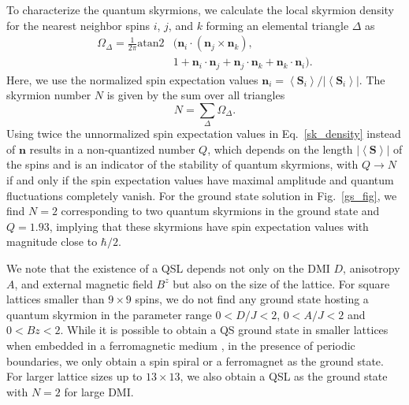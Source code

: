 \documentclass[aps,prb,twocolumn,superscriptaddress,a4paper,longbibliography]{revtex4-2}
\begin{document}
To characterize the quantum skyrmions, we calculate the local skyrmion density for the nearest neighbor spins $i$, $j$, and $k$ forming an elemental triangle $\Delta$ as \cite{berg_definition_1981,siegl_controlled_2022,peters_quantum_2023}
\begin{align}
    \Omega_{\Delta}=\frac{1}{2\pi}\text{atan2}&({\textbf{n}_i\cdot(\textbf{n}_j\times\textbf{n}_k)},\\
    &{1+\textbf{n}_i\cdot\textbf{n}_j+\textbf{n}_j\cdot\textbf{n}_k+\textbf{n}_k\cdot\textbf{n}_i}).
    \label{sk_density}
\end{align}
Here, we use the normalized spin expectation values $\textbf{n}_i=\left<\boldsymbol{S}_i\right>/|\left<\boldsymbol{S}_i\right>|$. The skyrmion number $N$ is given by the sum over all triangles
\begin{equation}
    N=\sum_{\Delta}\Omega_{\Delta}.
    \label{sk_no}
\end{equation}
Using twice the unnormalized spin expectation values in Eq.~\eqref{sk_density} instead of $\textbf{n}$ results in a non-quantized number $Q$, which depends on the length $|\left<\boldsymbol{S}\right>|$ of the spins and is an indicator of the stability of quantum skyrmions, with $Q\rightarrow N$ if and only if the spin expectation values have maximal amplitude \cite{siegl_controlled_2022} and quantum fluctuations completely vanish. For the ground state solution in Fig.~\ref{gs_fig}, we find $N=2$ corresponding to two quantum skyrmions in the ground state and $Q=1.93$, implying that these skyrmions have spin expectation values with magnitude close to $\hbar/2$. 

We note that the existence of a QSL depends not only on the DMI $D$, anisotropy $A$, and external magnetic field $B^z$ but also on the size of the lattice. For square lattices smaller than $9\times9$ spins, we do not find any ground state hosting a quantum skyrmion in the parameter range $0<D/J<2$, $0<A/J<2$ and $0<Bz<2$. While it is possible to obtain a QS ground state in smaller lattices when embedded in a ferromagnetic medium \cite{siegl_controlled_2022,joshi_ground_2023}, in the presence of periodic boundaries, we only obtain a spin spiral or a ferromagnet as the ground state. For larger lattice sizes up to $13\times13$, we also obtain a QSL as the ground state with $N=2$ for large DMI.
\end{document}

